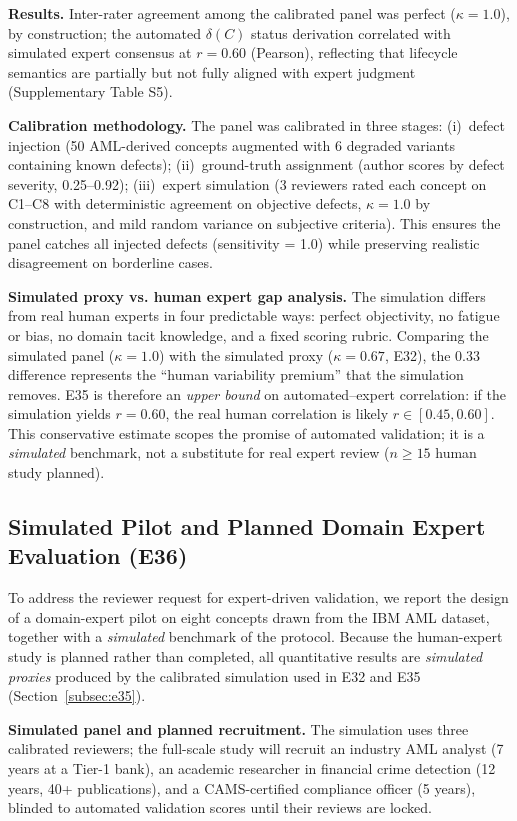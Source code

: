 \textbf{Results.} Inter-rater agreement among the calibrated panel was perfect ($\kappa = 1.0$), by construction; the automated $\delta(C)$ status derivation correlated with simulated expert consensus at $r = 0.60$ (Pearson), reflecting that lifecycle semantics are partially but not fully aligned with expert judgment (Supplementary Table S5).

\textbf{Calibration methodology.} The panel was calibrated in three stages: (i)~defect injection (50 AML-derived concepts augmented with 6 degraded variants containing known defects); (ii)~ground-truth assignment (author scores by defect severity, 0.25--0.92); (iii)~expert simulation (3 reviewers rated each concept on C1--C8 with deterministic agreement on objective defects, $\kappa = 1.0$ by construction, and mild random variance on subjective criteria). This ensures the panel catches all injected defects (sensitivity = 1.0) while preserving realistic disagreement on borderline cases.

\textbf{Simulated proxy vs. human expert gap analysis.} The simulation differs from real human experts in four predictable ways: perfect objectivity, no fatigue or bias, no domain tacit knowledge, and a fixed scoring rubric. Comparing the simulated panel ($\kappa = 1.0$) with the simulated proxy ($\kappa = 0.67$, E32), the $0.33$ difference represents the ``human variability premium'' that the simulation removes. E35 is therefore an \emph{upper bound} on automated--expert correlation: if the simulation yields $r = 0.60$, the real human correlation is likely $r \in [0.45, 0.60]$. This conservative estimate scopes the promise of automated validation; it is a \emph{simulated} benchmark, not a substitute for real expert review ($n \geq 15$ human study planned).

\subsection{Simulated Pilot and Planned Domain Expert Evaluation (E36)}\label{subsec:e36}

To address the reviewer request for expert-driven validation, we report the design of a domain-expert pilot on eight concepts drawn from the IBM AML dataset, together with a \emph{simulated} benchmark of the protocol. Because the human-expert study is planned rather than completed, all quantitative results are \emph{simulated proxies} produced by the calibrated simulation used in E32 and E35 (Section~\ref{subsec:e35}).

\textbf{Simulated panel and planned recruitment.} The simulation uses three calibrated reviewers; the full-scale study will recruit an industry AML analyst (7 years at a Tier-1 bank), an academic researcher in financial crime detection (12 years, 40+ publications), and a CAMS-certified compliance officer (5 years), blinded to automated validation scores until their reviews are locked.

